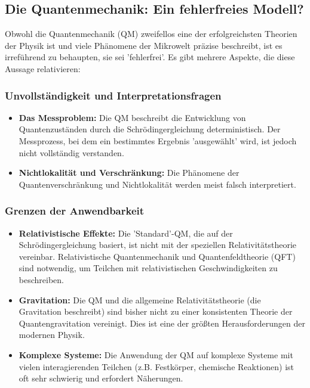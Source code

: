 \documentclass{article}
\begin{document}
\subsection{Die Quantenmechanik: Ein fehlerfreies Modell?}

Obwohl die Quantenmechanik (QM) zweifellos eine der erfolgreichsten Theorien der Physik ist und viele Phänomene der Mikrowelt präzise beschreibt, ist es irreführend zu behaupten, sie sei 'fehlerfrei'. Es gibt mehrere Aspekte, die diese Aussage relativieren:

\subsubsection{Unvollständigkeit und Interpretationsfragen}

\begin{itemize}
	\item \textbf{Das Messproblem:} Die QM beschreibt die Entwicklung von Quantenzuständen durch die Schrödingergleichung deterministisch. Der Messprozess, bei dem ein bestimmtes Ergebnis 'ausgewählt' wird, ist jedoch nicht vollständig verstanden. 
	\item \textbf{Nichtlokalität und Verschränkung:} Die Phänomene der Quantenverschränkung und Nichtlokalität werden meist falsch interpretiert. 
\end{itemize}

\subsubsection{Grenzen der Anwendbarkeit}

\begin{itemize}
	\item \textbf{Relativistische Effekte:} Die 'Standard'-QM, die auf der Schrödingergleichung basiert, ist nicht mit der speziellen Relativitätstheorie vereinbar. Relativistische Quantenmechanik und Quantenfeldtheorie (QFT) sind notwendig, um Teilchen mit relativistischen Geschwindigkeiten zu beschreiben.
	\item \textbf{Gravitation:} Die QM und die allgemeine Relativitätstheorie (die Gravitation beschreibt) sind bisher nicht zu einer konsistenten Theorie der Quantengravitation vereinigt. Dies ist eine der größten Herausforderungen der modernen Physik.
	\item \textbf{Komplexe Systeme:} Die Anwendung der QM auf komplexe Systeme mit vielen interagierenden Teilchen (z.B. Festkörper, chemische Reaktionen) ist oft sehr schwierig und erfordert Näherungen.
\end{itemize}
\end{document}

